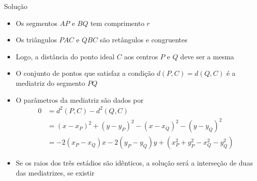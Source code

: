 \begin{frame}[fragile]{Solução}

    \begin{itemize}
        \item Os segmentos $AP$ e $BQ$ tem comprimento $r$

        \item Os triângulos $PAC$ e $QBC$ são retângulos e congruentes

        \item Logo, a distância do ponto ideal $C$ aos centros $P$ e $Q$ deve ser a mesma

        \item O conjunto de pontos que satisfaz a condição $d(P, C) = d(Q, C)$ é a mediatriz do
            segmento $PQ$

        \item O parâmetros da mediatriz são dados por
        \begin{align*}
            0 &= d^2(P, C) - d^2(Q, C) \\
            &= (x - x_P)^2 + (y - y_P)^2 - (x - x_Q)^2 - (y - y_Q)^2 \\
            &= -2(x_P - x_Q)x -2(y_P - y_Q)y + (x_P^2 + y_P^2 - x_Q^2 - y_Q^2)
        \end{align*}
            
        \item Se os raios dos três estádios são idênticos, a solução será a interseção de 
            duas das mediatrizes, se existir
    \end{itemize}

\end{frame}

